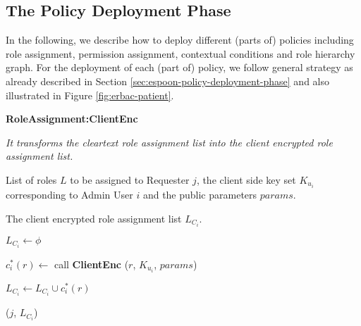 \documentclass[epsfig,a4paper,11pt,titlepage]{book}
\numberwithin{algorithm}{chapter}
\newcommand{\algofontsize}{\fontsize{11}{12}\selectfont}
\begin{document}
\subsection{The Policy Deployment Phase}
In the following, we describe how to deploy different (parts of) policies including role assignment, permission assignment, contextual conditions and role hierarchy graph. For the deployment of each (part of) policy, we follow general strategy as already described in Section \ref{sec:espoon-policy-deployment-phase} and also illustrated in Figure \ref{fig:erbac-patient}.



\begin{algorithm} [htp]
{\algofontsize
\caption{\textbf{RoleAssignment:ClientEnc}}

\label{algo:erbac-deploy-role-assignment-client-side}

\begin{algorithmic}[1]

\INPUT \emph{It transforms the cleartext role assignment list into the client encrypted role assignment list.}

\Require List of roles $L$ to be assigned to Requester $j$, the client side key set $K_{u_i}$ corresponding to Admin User $i$ and the public parameters $params$.

\Ensure The client encrypted role assignment list $L_{C_i}$.

\medskip

\State $L_{C_i} \leftarrow \phi$ \label{line:erbac-deploy-ra-cs-init}

 \label{line:erbac-deploy-ra-cs-loop}

	\State $c^*_i (r) \leftarrow$ call \textbf{ClientEnc} ($r$, $K_{u_i}$, $params$) {\algofontsize {}} \label{line:erbac-deploy-ra-cs-call-enc}
	
	\State $L_{C_i} \leftarrow L_{C_i} \cup c^*_i (r)$ \label{line:erbac-deploy-ra-cs-update}

\EndFor

\Return ($j$, $L_{C_i}$)

\end{algorithmic}
}
\end{algorithm}
\end{document}
